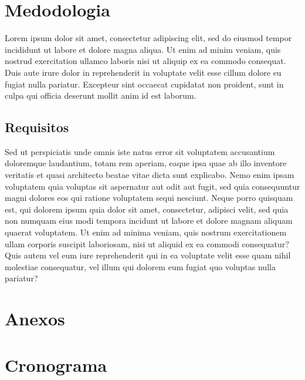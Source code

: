 \documentclass[
12pt,				    %
openright,			    %
oneside,			    %
a4paper,			    %
sumario=tradicional,    %
english,			    %
brazil,				    %
]{abntex2}              %
\begin{document}
	\chapter{Medodologia}\label{sec:metodos}
	
	Lorem ipsum dolor sit amet, consectetur adipiscing elit, sed do eiusmod tempor incididunt ut labore et dolore magna aliqua. Ut enim ad minim veniam, quis nostrud exercitation ullamco laboris nisi ut aliquip ex ea commodo consequat. Duis aute irure dolor in reprehenderit in voluptate velit esse cillum dolore eu fugiat nulla pariatur. Excepteur sint occaecat cupidatat non proident, sunt in culpa qui officia deserunt mollit anim id est laborum.
	
	\section{Requisitos}
	Sed ut perspiciatis unde omnis iste natus error sit voluptatem accusantium doloremque laudantium, totam rem aperiam, eaque ipsa quae ab illo inventore veritatis et quasi architecto beatae vitae dicta sunt explicabo. Nemo enim ipsam voluptatem quia voluptas sit aspernatur aut odit aut fugit, sed quia consequuntur magni dolores eos qui ratione voluptatem sequi nesciunt. Neque porro quisquam est, qui dolorem ipsum quia dolor sit amet, consectetur, adipisci velit, sed quia non numquam eius modi tempora incidunt ut labore et dolore magnam aliquam quaerat voluptatem. Ut enim ad minima veniam, quis nostrum exercitationem ullam corporis suscipit laboriosam, nisi ut aliquid ex ea commodi consequatur? Quis autem vel eum iure reprehenderit qui in ea voluptate velit esse quam nihil molestiae consequatur, vel illum qui dolorem eum fugiat quo voluptas nulla pariatur?
	
	\chapter{Anexos}\label{sec:anexos}
	
	\chapter{Cronograma}\label{sec:cronograma}
	
\end{document}
